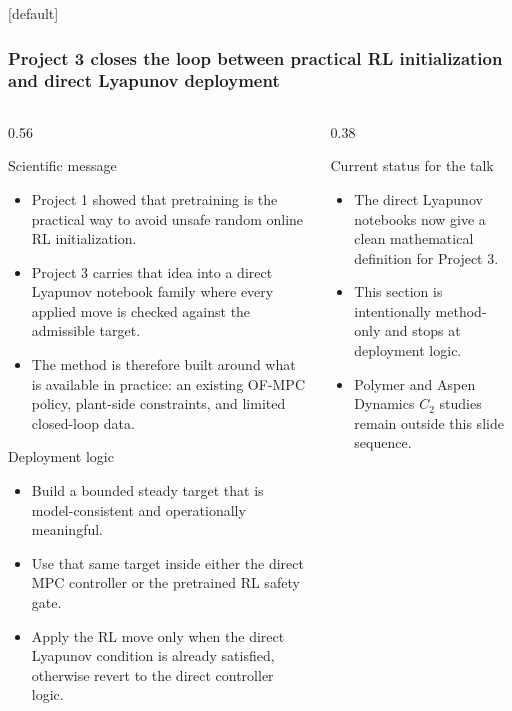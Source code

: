 \documentclass[aspectratio=169]{beamer}
\begin{document}
\begin{frame}
[default]
\frametitle{\large \textbf{Project 3 closes the loop between practical RL initialization and direct Lyapunov deployment}}
\scriptsize
\vspace{-0.28cm}

\begin{columns}[T,onlytextwidth]

\begin{column}{0.56\textwidth}
\begin{block}{Scientific message}
\begin{itemize}\justifying
  \setlength{\itemsep}{0.30ex}
  \item Project 1 showed that pretraining is the practical way to avoid unsafe random online RL initialization.
  \item Project 3 carries that idea into a direct Lyapunov notebook family where every applied move is checked against the admissible target.
  \item The method is therefore built around what is available in practice: an existing OF-MPC policy, plant-side constraints, and limited closed-loop data.
\end{itemize}
\end{block}

\vspace{0.02cm}

\begin{block}{Deployment logic}
\begin{itemize}\justifying
  \setlength{\itemsep}{0.30ex}
  \item Build a bounded steady target that is model-consistent and operationally meaningful.
  \item Use that same target inside either the direct MPC controller or the pretrained RL safety gate.
  \item Apply the RL move only when the direct Lyapunov condition is already satisfied, otherwise revert to the direct controller logic.
\end{itemize}
\end{block}
\end{column}

\begin{column}{0.38\textwidth}
\begin{block}{Current status for the talk}
\begin{itemize}\justifying
  \setlength{\itemsep}{0.30ex}
  \item The direct Lyapunov notebooks now give a clean mathematical definition for Project 3.
  \item This section is intentionally method-only and stops at deployment logic.
  \item Polymer and Aspen Dynamics \(C_2\) studies remain outside this slide sequence.
\end{itemize}
\end{block}


\end{column}
\end{columns}
\end{frame}
\end{document}
